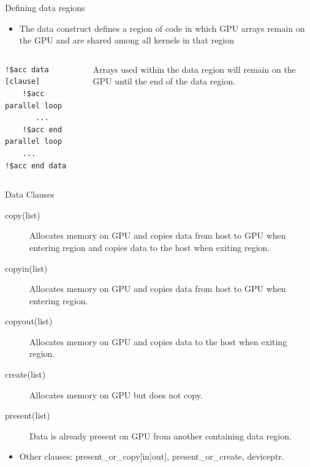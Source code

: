 \documentclass[10pt,t]{beamer}
\begin{document}
\begin{frame}[fragile]{Defining data regions}
  \begin{itemize}
    \item The data construct defines a region of code in which GPU arrays remain on the GPU and are shared among all kernels in that region
  \end{itemize}
  \begin{columns}
    \column{9cm}
  \begin{exampleblock}{}
    \begin{columns}[c]
      \column{3.5cm}
      \begin{lstlisting}[basicstyle=\small\ttfamily,language=OmpFortran]
!$acc data [clause]
    !$acc parallel loop
       ...
    !$acc end parallel loop
    ...
!$acc end data
      \end{lstlisting}
      \column{0.5cm}
      \fontsize{85}{20}\selectfont{\color{lubrown}\}}
      \column{3cm}
      Arrays used within the data region will remain on the GPU until the end of the data region.
    \end{columns}
  \end{exampleblock}
  \end{columns}
\end{frame}

\begin{frame}{ Data Clauses}
  \begin{description}
    \item[copy(list)] Allocates memory on GPU and copies data from host to GPU when entering region and copies data to the host when exiting region.
    \item[copyin(list)] Allocates memory on GPU and copies data from host to GPU when entering region.
    \item[copyout(list)] Allocates memory on GPU and copies data to the host when exiting region.
    \item[create(list)] Allocates memory on GPU but does not copy.
    \item[present(list)] Data is already present on GPU from another containing data region.
  \end{description}
  \begin{itemize}
    \item Other clauses: {\color{lubrown}present\_or\_copy[in|out]}, {\color{lubrown}present\_or\_create}, {\color{lubrown}deviceptr}.
  \end{itemize}
\end{frame}
\end{document}
